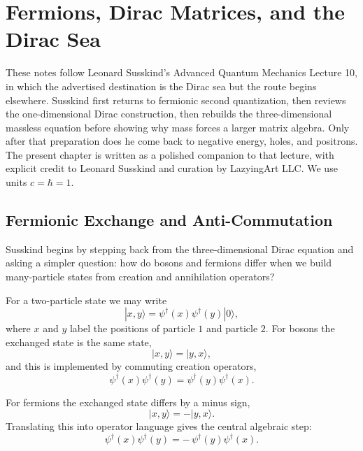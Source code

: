 \chapter{Fermions, Dirac Matrices, and the Dirac Sea}

These notes follow Leonard Susskind's Advanced Quantum Mechanics Lecture 10, in which the advertised destination is the Dirac sea but the route begins elsewhere. Susskind first returns to fermionic second quantization, then reviews the one-dimensional Dirac construction, then rebuilds the three-dimensional massless equation before showing why mass forces a larger matrix algebra. Only after that preparation does he come back to negative energy, holes, and positrons. The present chapter is written as a polished companion to that lecture, with explicit credit to Leonard Susskind and curation by LazyingArt LLC. We use units \(c=\hbar=1\).

\section{Fermionic Exchange and Anti-Commutation}

Susskind begins by stepping back from the three-dimensional Dirac equation and asking a simpler question: how do bosons and fermions differ when we build many-particle states from creation and annihilation operators?

For a two-particle state we may write
\begin{equation}
|x,y\rangle=\psi^\dagger(x)\psi^\dagger(y)|0\rangle,
\end{equation}
where \(x\) and \(y\) label the positions of particle \(1\) and particle \(2\). For bosons the exchanged state is the same state,
\begin{equation}
|x,y\rangle=|y,x\rangle,
\end{equation}
and this is implemented by commuting creation operators,
\begin{equation}
\psi^\dagger(x)\psi^\dagger(y)=\psi^\dagger(y)\psi^\dagger(x).
\end{equation}

For fermions the exchanged state differs by a minus sign,
\begin{equation}
|x,y\rangle=-|y,x\rangle.
\end{equation}
Translating this into operator language gives the central algebraic step:
\begin{equation}
\psi^\dagger(x)\psi^\dagger(y)=-\,\psi^\dagger(y)\psi^\dagger(x).
\end{equation}

